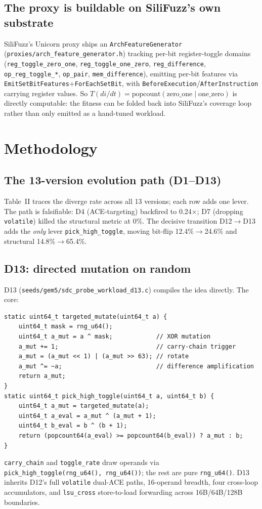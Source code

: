 \documentclass[sigplan,review,anonymous]{acmart}
\begin{document}
\subsection{The proxy is buildable on SiliFuzz's own substrate}
SiliFuzz's Unicorn proxy ships an \texttt{ArchFeatureGenerator} (\texttt{proxies/arch\_feature\_generator.h}) tracking per-bit register-toggle domains (\texttt{reg\_toggle\_zero\_one}, \texttt{reg\_toggle\_one\_zero}, \texttt{reg\_difference}, \texttt{op\_reg\_toggle\_*}, \texttt{op\_pair}, \texttt{mem\_difference}), emitting per-bit features via \texttt{EmitSetBitFeatures}+\texttt{ForEachSetBit}, with \texttt{BeforeExecution}/\texttt{AfterInstruction} carrying register values. So $T(di/dt) = \text{popcount}(\text{zero\_one} \mid \text{one\_zero})$ is directly computable: the fitness can be folded back into SiliFuzz's coverage loop rather than only emitted as a hand-tuned workload.

\section{Methodology}
\label{sec:method}

\subsection{The 13-version evolution path (D1--D13)}
Table~II traces the diverge rate across all 13 versions; each row adds one lever. The path is falsifiable: D4 (ACE-targeting) backfired to 0.24$\times$; D7 (dropping \texttt{volatile}) killed the structural metric at 0\%. The decisive transition D12$\to$D13 adds the \emph{only} lever \texttt{pick\_high\_toggle}, moving bit-flip 12.4\%$\to$24.6\% and structural 14.8\%$\to$65.4\%.

\subsection{D13: directed mutation on random}
D13 (\texttt{seeds/gem5/sdc\_probe\_workload\_d13.c}) compiles the idea directly. The core:
\begin{verbatim}
static uint64_t targeted_mutate(uint64_t a) {
    uint64_t mask = rng_u64();
    uint64_t a_mut = a ^ mask;            // XOR mutation
    a_mut += 1;                           // carry-chain trigger
    a_mut = (a_mut << 1) | (a_mut >> 63); // rotate
    a_mut ^= ~a;                          // difference amplification
    return a_mut;
}
static uint64_t pick_high_toggle(uint64_t a, uint64_t b) {
    uint64_t a_mut = targeted_mutate(a);
    uint64_t a_eval = a_mut ^ (a_mut + 1);
    uint64_t b_eval = b ^ (b + 1);
    return (popcount64(a_eval) >= popcount64(b_eval)) ? a_mut : b;
}
\end{verbatim}
\texttt{carry\_chain} and \texttt{toggle\_rate} draw operands via \texttt{pick\_high\_toggle(rng\_u64(), rng\_u64())}; the rest are pure \texttt{rng\_u64()}. D13 inherits D12's full \texttt{volatile} dual-ACE paths, 16-operand breadth, four cross-loop accumulators, and \texttt{lsu\_cross} store-to-load forwarding across 16B/64B/128B boundaries.
\end{document}
